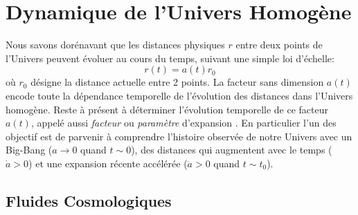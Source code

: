 
\chapter{Dynamique de l'Univers Homogène}
Nous savons dorénavant que les distances physiques  $r$ entre deux points de l'Univers peuvent évoluer au cours du temps, suivant une simple loi d'échelle:
\begin{equation}
r(t)=a(t)r_0
\end{equation}
où $r_0$ désigne la distance actuelle entre 2 points. La facteur sans dimension $a(t)$ encode toute la dépendance temporelle de l'évolution des distances dans l'Univers homogène. Reste à présent à déterminer l'évolution temporelle de ce facteur $a(t)$, appelé aussi \textit{facteur} ou \textit{paramètre} d'expansion .
En particulier l'un des objectif est de parvenir à comprendre l'histoire observée de notre Univers avec un Big-Bang ($a\rightarrow 0$ quand $t\sim 0$), des distances qui augmentent avec le temps ($\dot a>0$) et une expansion récente accélérée ($\ddot a>0$ quand $t\sim t_0$).

\section{Fluides Cosmologiques}

